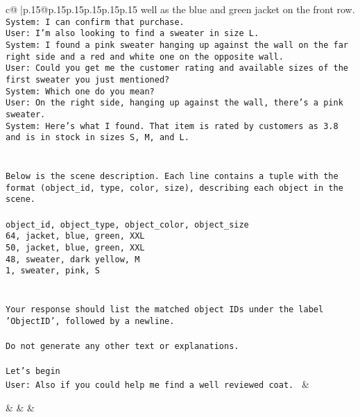 \documentclass{article}
\begin{document}
{\begin{supertabular}{c@{$\;$}|p{.15\linewidth}@{}p{.15\linewidth}p{.15\linewidth}p{.15\linewidth}p{.15\linewidth}p{.15\linewidth}}
{{{well as the blue and green jacket on the front row.\\ \tt System: I can confirm that purchase.\\ \tt User: I'm also looking to find a sweater in size L.\\ \tt System: I found a pink sweater hanging up against the wall on the far right side and a red and white one on the opposite wall.\\ \tt User: Could you get me the customer rating and available sizes of the first sweater you just mentioned?\\ \tt System: Which one do you mean?\\ \tt User: On the right side, hanging up against the wall, there's a pink sweater.\\ \tt System: Here's what I found. That item is rated by customers as 3.8 and is in stock in sizes S, M, and L.\\ \tt \\ \tt \\ \tt Below is the scene description. Each line contains a tuple with the format (object_id, type, color, size), describing each object in the scene.\\ \tt \\ \tt object_id, object_type, object_color, object_size\\ \tt 64, jacket, blue, green, XXL\\ \tt 50, jacket, blue, green, XXL\\ \tt 48, sweater, dark yellow, M\\ \tt 1, sweater, pink, S\\ \tt \\ \tt \\ \tt Your response should list the matched object IDs under the label 'ObjectID', followed by a newline.\\ \tt \\ \tt Do not generate any other text or explanations.\\ \tt \\ \tt Let's begin\\ \tt User: Also if you could help me find a well reviewed coat. 
	  } 
	   } 
	   } 
	 & \\ 
 

    \theutterance {}  

    &  
	 & & \\ 
 


\end{supertabular}}
\end{document}
